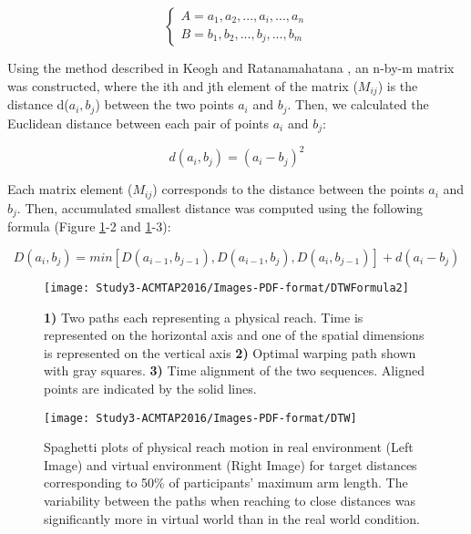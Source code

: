 \begin{equation} \label{pathA}
\begin{cases}
A =  a_1, a_2, ..., a_i, ..., a_n	\\	
B =  b_1, b_2, ..., b_j, ..., b_m
\end{cases}
\end{equation}


Using the method described in Keogh and Ratanamahatana \cite{kr05}, an n-by-m matrix was constructed, where the ith and jth element of the matrix ($M_{ij}$) is the distance d($a_i, b_j$) between the two points $a_i$ and $b_j$. Then, we calculated the Euclidean distance between each pair of points $a_i$ and $b_j$:

\begin{equation} \label{euclidean distance1}
d(a_i, b_j) = (a_i-b_j)^2
\end{equation}

Each matrix element ($M_{ij}$) corresponds to the distance between the points $a_i$ and $b_j$. Then, accumulated smallest distance was computed using the following formula (Figure \ref{fig:DTWMethod}-2 and \ref{fig:DTWMethod}-3):

\begin{equation} \label{euclidean distance2}
D(a_i, b_j) = min[D(a_{i-1}, b_{j-1}), D(a_{i-1}, b_{j}), D(a_{i}, b_{j-1})] + d(a_i-b_j)
\end{equation}

\begin{figure}[!htb]
	\centering
	\texttt{[image: Study3-ACMTAP2016/Images-PDF-format/DTWFormula2]}
	\caption{\textsf{\textbf{1)} Two paths each representing a physical reach. Time is represented on the horizontal axis and one of the spatial dimensions is represented on the vertical axis \textbf{2)} Optimal warping path shown with gray squares. \textbf{3)} Time alignment of the two sequences. Aligned points are indicated by the solid lines.}}
	\label{fig:DTWMethod}	
\end{figure}

\begin{figure}[!htb]
	\centering
	\texttt{[image: Study3-ACMTAP2016/Images-PDF-format/DTW]}
	\caption{\textsf{Spaghetti plots of physical reach motion in real environment (Left Image) and virtual environment (Right Image) for target distances corresponding to 50\% of participants' maximum arm length. The variability between the paths when reaching to close distances was significantly more in virtual world than in the real world condition.}}
	\label{fig:DTW}	
\end{figure}


